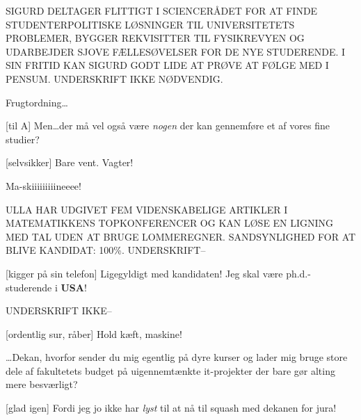 \documentclass[a4paper,11pt]{article}
\begin{document}
\begin{sketch}

 SIGURD DELTAGER FLITTIGT I SCIENCERÅDET FOR AT FINDE STUDENTERPOLITISKE
LØSNINGER TIL UNIVERSITETETS PROBLEMER, BYGGER REKVISITTER TIL FYSIKREVYEN OG
UDARBEJDER SJOVE FÆLLESØVELSER FOR DE NYE STUDERENDE.  I SIN FRITID KAN SIGURD
GODT LIDE AT PRØVE AT FØLGE MED I PENSUM.  UNDERSKRIFT IKKE
NØDVENDIG.


 
Frugtordning\ldots

[til A] Men\ldots der må vel også være \emph{nogen} der kan gennemføre
et af vores fine studier?

[selvsikker] Bare vent.  Vagter!


 Ma-skiiiiiiiiineeee!



 ULLA HAR UDGIVET FEM VIDENSKABELIGE ARTIKLER I MATEMATIKKENS
TOPKONFERENCER OG KAN LØSE EN LIGNING MED TAL UDEN AT BRUGE LOMMEREGNER.
SANDSYNLIGHED FOR AT BLIVE KANDIDAT: 100\%.  UNDERSKRIFT--

[kigger på sin telefon] Ligegyldigt med kandidaten!  Jeg skal være
ph.d.-studerende i \textbf{USA}!


 UNDERSKRIFT IKKE--

[ordentlig sur, råber] Hold kæft, maskine!


 \ldots Dekan, hvorfor sender du mig egentlig på dyre kurser og lader
mig bruge store dele af fakultetets budget på uigennemtænkte it-projekter der
bare gør alting mere besværligt?

[glad igen] Fordi jeg jo ikke har \emph{lyst} til at nå til squash med
dekanen for jura!  


\end{sketch}
\end{document}
